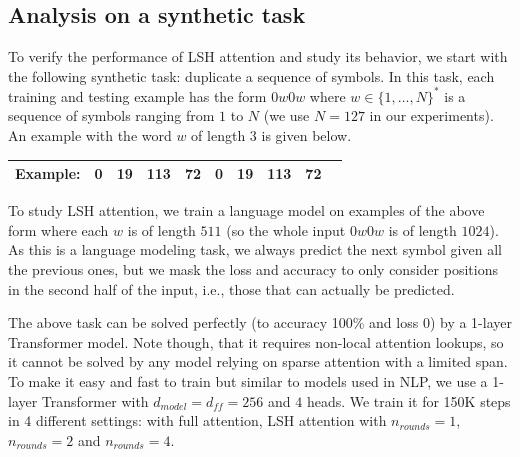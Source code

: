 \documentclass{article} %
\begin{document}
\subsection{Analysis on a synthetic task}

To verify the performance of LSH attention and study its behavior,
we start with the following synthetic task: duplicate a sequence
of symbols. In this task, each training and testing example has
the form $0w0w$ where $w \in \{1, \dots, N\}^*$ is a sequence of
symbols ranging from $1$ to $N$ (we use $N = 127$ in our experiments).
An example with the word $w$ of length $3$ is given below.

\begin{center}
\vspace{0.5em}
\begin{tabular}{|c|c|c|c|c|c|c|c|c|c|}
\hline
{\bf Example:} & 0 & 19 & 113 & 72 & 0  & 19  & 113  & 72  \\ \hline
\end{tabular}
\vspace{0.5em}
\end{center}

To study LSH attention, we train a language model on examples of
the above form where each $w$ is of length $511$ (so the whole input
$0w0w$ is of length $1024$). As this is a language modeling task,
we always predict the next symbol given all the previous ones,
but we mask the loss and accuracy to only consider positions in the
second half of the input, i.e., those that can actually be predicted.

The above task can be solved perfectly (to accuracy 100\% and loss 0) by
a 1-layer Transformer model. Note though, that it requires non-local
attention lookups, so it cannot be solved by any model relying on sparse
attention with a limited span.
To make it easy and fast to train but similar
to models used in NLP, we use a 1-layer Transformer with
$d_{model} = d_{ff} = 256$ and $4$ heads. We train it for 150K steps
in $4$ different settings: with full attention, LSH attention with
$n_{rounds} = 1$, $n_{rounds} = 2$ and $n_{rounds} = 4$.
\end{document}
